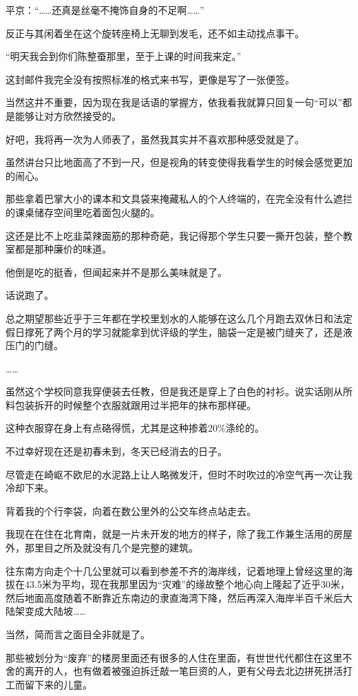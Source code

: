 平京：“……还真是丝毫不掩饰自身的不足啊……”

反正与其闲着坐在这个旋转座椅上无聊到发毛，还不如主动找点事干。

“明天我会到你们陈整蚕那里，至于上课的时间我来定。”

这封邮件我完全没有按照标准的格式来书写，更像是写了一张便签。

当然这并不重要，因为现在我是话语的掌握方，依我看我就算只回复一句“可以”都是能够让对方欣然接受的。

好吧，我将再一次为人师表了，虽然我其实并不喜欢那种感受就是了。

虽然讲台只比地面高了不到一尺，但是视角的转变使得我看学生的时候会感觉更加的闹心。

那些拿着巴掌大小的课本和文具袋来掩藏私人的个人终端的，在完全没有什么遮拦的课桌储存空间里吃着面包火腿的。

这还是比不上吃韭菜辣面筋的那种奇葩，我记得那个学生只要一撕开包装，整个教室都是那种廉价的味道。

他倒是吃的挺香，但闻起来并不是那么美味就是了。

话说跑了。

总之期望那些近乎于三年都在学校里划水的人能够在这么几个月跑去双休日和法定假日撑死了两个月的学习就能拿到优评级的学生，脑袋一定是被门缝夹了，还是液压门的门缝。

……

虽然这个学校同意我穿便装去任教，但是我还是穿上了白色的衬衫。说实话刚从所料包装拆开的时候整个衣服就跟用过半把年的抹布那样硬。

这种衣服穿在身上有点硌得慌，尤其是这种掺着20\%涤纶的。

不过幸好现在还是初春未到，冬天已经消去的日子。

尽管走在崎岖不欧尼的水泥路上让人略微发汗，但时不时吹过的冷空气再一次让我冷却下来。

背着我的个行李袋，向着在数公里外的公交车终点站走去。

我现在在住在北育南，就是一片未开发的地方的样子，除了我工作兼生活用的房屋外，那里目之所及就没有几个是完整的建筑。

往东南方向走个十几公里就可以看到参差不齐的海岸线，记着地理上曾经这里的海拔在43.5米为平均，现在我那里因为“灾难”的缘故整个地心向上隆起了近乎30米，然后地面高度随着不断靠近东南边的隶直海湾下降，然后再深入海岸半百千米后大陆架变成大陆坡……

当然，简而言之面目全非就是了。

那些被划分为“废弃”的楼房里面还有很多的人住在里面，有世世代代都住在这里不舍的离开的人，也有做着被强迫拆迁敲一笔巨资的人，更有父母去北边拼死拼活打工而留下来的儿童。


